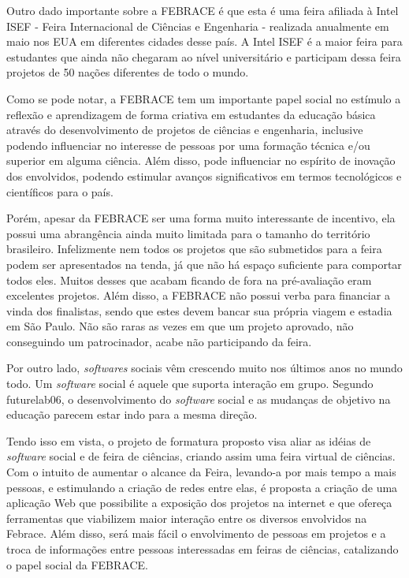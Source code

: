 Outro dado importante sobre a FEBRACE é que esta é uma feira afiliada à Intel ISEF - Feira Internacional de Ciências e Engenharia - realizada anualmente em maio nos EUA em diferentes cidades desse país. A Intel ISEF é a maior feira para estudantes que ainda não chegaram ao nível universitário e participam dessa feira projetos de 50 nações diferentes de todo o mundo.

Como se pode notar, a FEBRACE tem um importante papel social no estímulo a reflexão e aprendizagem de forma criativa em estudantes da educação básica através do desenvolvimento de projetos de ciências e engenharia, inclusive podendo influenciar no interesse de pessoas por uma formação técnica e/ou superior em alguma ciência. Além disso, pode influenciar no espírito de inovação dos envolvidos, podendo estimular avanços significativos em termos tecnológicos e científicos para o país.

Porém, apesar da FEBRACE ser uma forma muito interessante de incentivo, ela possui uma abrangência ainda muito limitada para o tamanho do território brasileiro. Infelizmente nem todos os projetos que são submetidos para a feira podem ser apresentados na tenda, já que não há espaço suficiente para comportar todos eles. Muitos desses que acabam ficando de fora na pré-avaliação eram excelentes projetos. Além disso, a FEBRACE não possui verba para financiar a vinda dos finalistas, sendo que estes devem bancar sua própria viagem e estadia em São Paulo. Não são raras as vezes em que um projeto aprovado, não conseguindo um patrocinador, acabe não participando da feira.

Por outro lado, \textit{softwares} sociais vêm crescendo muito nos últimos anos no mundo todo. Um \textit{software} social é aquele que suporta interação em grupo. Segundo {futurelab06}, o desenvolvimento do \textit{software} social e as mudanças de objetivo na educação parecem estar indo para a mesma direção.

Tendo isso em vista, o projeto de formatura proposto visa aliar as idéias de \textit{software} social e de feira de ciências, criando assim uma feira virtual de ciências. Com o intuito de aumentar o alcance da Feira, levando-a por mais tempo a mais pessoas, e estimulando a criação de redes entre elas, é proposta a criação de uma aplicação Web que possibilite a exposição dos projetos na internet e que ofereça ferramentas que viabilizem maior interação entre os diversos envolvidos na Febrace. Além disso, será mais fácil o envolvimento de pessoas em projetos e a troca de informações entre pessoas interessadas em feiras de ciências, catalizando o papel social da FEBRACE.

